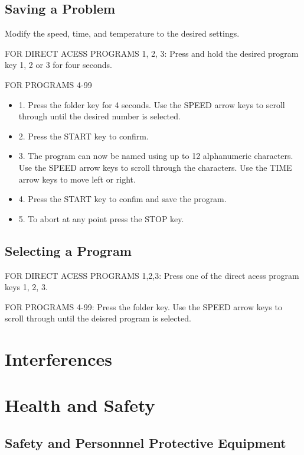 \documentclass[12pt]{../SOP3_beta}
\begin{document}
\subsection*{Saving a Problem}

\NP Modify the speed, time, and temperature to the desired settings. 

\NP FOR DIRECT ACESS PROGRAMS 1, 2, 3: Press and hold the desired program key 1, 2 or 3 for four seconds. 

\NP FOR PROGRAMS 4-99

\begin{itemize}
  \item 1. Press the folder key for 4 seconds. Use the SPEED arrow keys to scroll through until the desired number is selected.
  \item 2. Press the START key to confirm.
  \item 3. The program can now be named using up to 12 alphanumeric characters. Use the SPEED arrow keys to scroll through the characters. Use the TIME arrow keys to move left or right.
  \item 4. Press the START key to confim and save the program. 
  \item 5. To abort at any point press the STOP key.
\end{itemize}

\subsection*{Selecting a Program}

\NP FOR DIRECT ACESS PROGRAMS 1,2,3: Press one of the direct acess program keys 1, 2, 3.

\NP FOR PROGRAMS 4-99: Press the folder key. Use the SPEED arrow keys to scroll through until the deisred program is selected. 



\section{Interferences}

\section{Health and Safety}

\NP \lipsum[2]

\subsection{Safety and Personnnel Protective Equipment}
\end{document}
